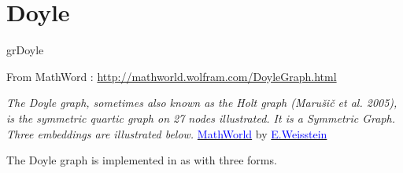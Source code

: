 \newpage\section{Doyle}\label{doyle}
\begin{NewMacroBox}{grDoyle}{}

\medskip
From MathWord : \url{http://mathworld.wolfram.com/DoyleGraph.html}  

\emph{The Doyle graph, sometimes also known as the Holt graph (Marušič et al. 2005), is the symmetric quartic graph on 27 nodes illustrated. It is a Symmetric Graph. Three embeddings are illustrated below.}
\href{http://mathworld.wolfram.com/topics/GraphTheory.html}%
           {\textcolor{blue}{MathWorld}} by \href{http://en.wikipedia.org/wiki/Eric_W._Weisstein}%
           {\textcolor{blue}{E.Weisstein}}

\medskip
The Doyle graph is implemented in  as  with three forms.
\end{NewMacroBox}

\subsection{}
\begin{center}
\begin{tkzexample}[vbox]
\end{tkzexample} 
\end{center}

\vfill\newpage
\subsection{}

\begin{center}
\begin{tkzexample}[vbox]
\end{tkzexample} 
\end{center}

